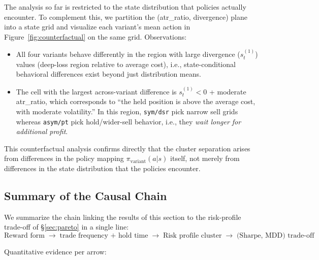 \documentclass[11pt, a4paper]{article}
\begin{document}
The analysis so far is restricted to the state distribution that policies
actually encounter. To complement this, we partition the (atr\_ratio,
divergence) plane into a state grid and visualize each variant's mean action
in Figure~\ref{fig:counterfactual} on the same grid. Observations:
\begin{itemize}[leftmargin=*]
\item All four variants behave differently in the region with large
divergence ($s_t^{(1)}$) values (deep-loss region relative to average cost),
i.e., state-conditional behavioral differences exist beyond just distribution
means.
\item The cell with the largest across-variant difference is
$s_t^{(1)} < 0$ + moderate atr\_ratio, which corresponds to ``the held
position is above the average cost, with moderate volatility.'' In this
region, \texttt{sym/dsr} pick narrow sell grids whereas \texttt{asym/pt}
pick hold/wider-sell behavior, i.e., they \emph{wait longer for additional
profit}.
\end{itemize}
This counterfactual analysis confirms directly that the cluster separation
arises from differences in the policy mapping $\pi_{\text{variant}}(a|s)$
itself, not merely from differences in the state distribution that the
policies encounter.

\subsection{Summary of the Causal Chain}
\label{sec:mechanism_causal}

We summarize the chain linking the results of this section to the
risk-profile trade-off of \S\ref{sec:pareto} in a single line:
\[
\boxed{
\text{Reward form}
\;\to\;
\text{trade frequency + hold time}
\;\to\;
\text{Risk profile cluster}
\;\to\;
\text{(Sharpe, MDD) trade-off}
}
\]

Quantitative evidence per arrow:
\end{document}
